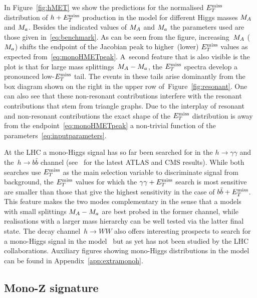 In Figure~\ref{fig:hMET} we show the predictions for the normalised $E_T^\mathrm{miss}$ distribution of $h+E_T^\mathrm{miss}$ production in the \hdma model for different Higgs masses $M_{A}$ and $M_{a}$. Besides the indicated values of $M_{A}$ and $M_{a}$ the parameters  used  are those given in~\eqref{eq:benchmark}. As can be seen from the figure,  increasing~$M_{A}$ ($M_{a}$) shifts the endpoint of the Jacobian peak to higher~(lower) $E_T^\mathrm{miss}$  values as expected from~\eqref{eq:monoHMETpeak}. A~second feature that is also visible is  the plot is that for large mass splittings~$M_{A} - M_{a}$, the $E_T^\mathrm{miss}$ spectra develop a pronounced low-$E_T^\mathrm{miss}$ tail. The events in these tails arise dominantly from the box diagram shown on the right in the upper row of~Figure~\ref{fig:resonant}. One can also see that these non-resonant contributions interfere with the resonant contributions that stem from triangle graphs. Due to the interplay of resonant and non-resonant contributions  the exact shape of the $E_T^\mathrm{miss}$ distribution is   away from the endpoint~\eqref{eq:monoHMETpeak} a non-trivial function of the \hdma parameters~\eqref{eq:inputparameters}.  

At the LHC a mono-Higgs signal has so far been searched for in the $h \to \gamma \gamma$ and the~$h \to b \bar b$ channel (see~\cite{Aaboud:2017uak,Aaboud:2017yqz,CMS-PAS-B2G-17-004}  for the latest ATLAS and CMS results).  While both searches use $E_T^\mathrm{miss}$ as the main selection variable to discriminate signal from background, the $E_T^\mathrm{miss}$ values for which the $\gamma \gamma + E_T^\mathrm{miss}$ search is most sensitive are smaller than those that give the highest sensitivity in the case of $b \bar b + E_T^\mathrm{miss}$. This feature makes the two modes complementary in the sense that a models with  small  splittings $M_{A} - M_{a}$ are best probed in the former channel, while realisations with a larger mass hierarchy can be well tested via the latter final state. The decay channel~$h \to WW$ also offers interesting prospects to search for a mono-Higgs signal in the \hdma model~\cite{GPHeidelberg} but as yet has not been studied by the LHC collaborations.  Auxiliary figures showing mono-Higgs distributions in the \hdma model can be found in Appendix~\ref{app:extramonoh}. 

\subsection*{Mono-$\bm{Z}$ signature}

